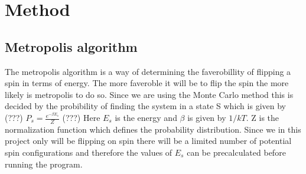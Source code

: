 \documentclass{article}
\begin{document}
\section{Method}






\subsection{Metropolis algorithm}
\newline
\newline
The metropolis algorithm is a way of determining the faverobillity of flipping a spin in terms of energy. The more faveroble it will be to flip the spin the more likely is metropolis to do so. Since we are using the Monte Carlo method this is decided by the probibility of finding the system in a state S which is given by (???)
\newline
\newline
$P_s = \frac{e^{-\beta E_s}}{Z} $ (???)
\newline
\newline
Here $E_s$ is the energy and $\beta$ is given by $1/kT$. Z is the normalization function which defines the probability distribution.
\newline
\newline
Since we in this project only will be flipping on spin there will be a limited number of potential spin configurations and therefore the values of $E_s$ can be precalculated before running the program.
\newline
\newline
\end{document}
